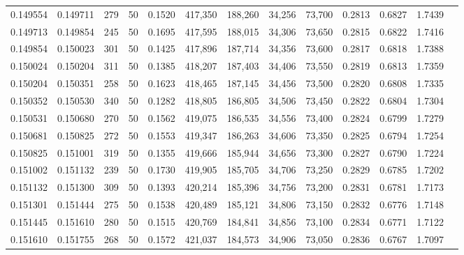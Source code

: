 \begin{tabular}{rrrrrrrrrrrrr}
0.149554 & 0.149711 &   279 &  50 &                                     0.1520 & 417,350 & 188,260 &  34,256 &  73,700 & 0.2813 & 0.6827 & 1.7439 \\
0.149713 & 0.149854 &   245 &  50 &                                     0.1695 & 417,595 & 188,015 &  34,306 &  73,650 & 0.2815 & 0.6822 & 1.7416 \\
0.149854 & 0.150023 &   301 &  50 &                                     0.1425 & 417,896 & 187,714 &  34,356 &  73,600 & 0.2817 & 0.6818 & 1.7388 \\
0.150024 & 0.150204 &   311 &  50 &                                     0.1385 & 418,207 & 187,403 &  34,406 &  73,550 & 0.2819 & 0.6813 & 1.7359 \\
0.150204 & 0.150351 &   258 &  50 &                                     0.1623 & 418,465 & 187,145 &  34,456 &  73,500 & 0.2820 & 0.6808 & 1.7335 \\
0.150352 & 0.150530 &   340 &  50 &                                     0.1282 & 418,805 & 186,805 &  34,506 &  73,450 & 0.2822 & 0.6804 & 1.7304 \\
0.150531 & 0.150680 &   270 &  50 &                                     0.1562 & 419,075 & 186,535 &  34,556 &  73,400 & 0.2824 & 0.6799 & 1.7279 \\
0.150681 & 0.150825 &   272 &  50 &                                     0.1553 & 419,347 & 186,263 &  34,606 &  73,350 & 0.2825 & 0.6794 & 1.7254 \\
0.150825 & 0.151001 &   319 &  50 &                                     0.1355 & 419,666 & 185,944 &  34,656 &  73,300 & 0.2827 & 0.6790 & 1.7224 \\
0.151002 & 0.151132 &   239 &  50 &                                     0.1730 & 419,905 & 185,705 &  34,706 &  73,250 & 0.2829 & 0.6785 & 1.7202 \\
0.151132 & 0.151300 &   309 &  50 &                                     0.1393 & 420,214 & 185,396 &  34,756 &  73,200 & 0.2831 & 0.6781 & 1.7173 \\
0.151301 & 0.151444 &   275 &  50 &                                     0.1538 & 420,489 & 185,121 &  34,806 &  73,150 & 0.2832 & 0.6776 & 1.7148 \\
0.151445 & 0.151610 &   280 &  50 &                                     0.1515 & 420,769 & 184,841 &  34,856 &  73,100 & 0.2834 & 0.6771 & 1.7122 \\
0.151610 & 0.151755 &   268 &  50 &                                     0.1572 & 421,037 & 184,573 &  34,906 &  73,050 & 0.2836 & 0.6767 & 1.7097 \\

\end{tabular}
